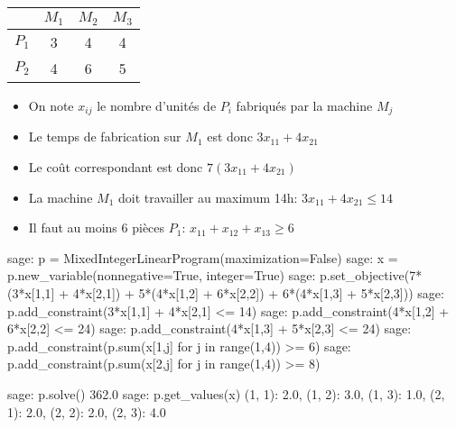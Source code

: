 \documentclass[french]{beamer}
\begin{document}
\begin{frame}
  
\begin{center}  
\begin{tabular}{|c|c|c|c|}
 \cline{2-4}
     \multicolumn{1}{c|}{}
  &$M_1$&$M_2$&$M_3$ \\
\hline
 $P_1$ &3&4&4 \\
\hline
 $P_2$ &4&6&5 \\
\hline
\end{tabular}
\end{center}

  
  \begin{itemize}
  \item On  note $x_{ij}$ le nombre  d'unités de $P_i$ fabriqués  par la machine
    $M_j$
  \item Le temps de fabrication sur $M_1$ est donc $3x_{11}+4x_{21}$
  \item Le coût correspondant est donc $7(3x_{11}+4x_{21})$
    \item    La    machine   $M_1$    doit    travailler    au   maximum    14h:
      $3x_{11}+4x_{21}\leqslant 14$
    \item Il faut au moins 6 pièces $P_1$: $x_{11}+x_{12}+x_{13}\geqslant 6$
  \end{itemize}
\end{frame}



\begin{frame}[fragile]
\begin{pythoncode}
sage: p = MixedIntegerLinearProgram(maximization=False)
sage: x = p.new_variable(nonnegative=True, integer=True)
sage: p.set_objective(7*(3*x[1,1] + 4*x[2,1]) + 5*(4*x[1,2] + 6*x[2,2]) + 6*(4*x[1,3] + 5*x[2,3]))
sage: p.add_constraint(3*x[1,1] + 4*x[2,1] <= 14)
sage: p.add_constraint(4*x[1,2] + 6*x[2,2] <= 24)
sage: p.add_constraint(4*x[1,3] + 5*x[2,3] <= 24)
sage: p.add_constraint(p.sum(x[1,j] for j in range(1,4)) >= 6)
sage: p.add_constraint(p.sum(x[2,j] for j in range(1,4)) >= 8)
\end{pythoncode}

  \pause

\begin{pythoncode}
sage: p.solve()
362.0
sage: p.get_values(x)
{(1, 1): 2.0, (1, 2): 3.0, (1, 3): 1.0, (2, 1): 2.0, (2, 2): 2.0, (2, 3): 4.0}
\end{pythoncode}


  

\end{frame}
\end{document}

